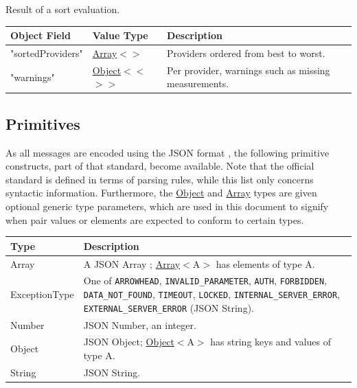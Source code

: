 \documentclass[a4paper]{arrowhead}
\newcommand{\pdef}[1]{{\textcolor{ArrowheadGrey}{#1 \label{sec:model:primitives:#1} \label{sec:model:primitives:#1s}}}}
\newcommand{\pref}[1]{{\textcolor{ArrowheadGrey}{\hyperref[sec:model:primitives:#1]{#1}}}}
\begin{document}

Result of a sort evaluation.


\noindent\begin{tabularx}{\textwidth}{| >{\raggedright\arraybackslash}p{3.9cm} | >{\raggedright\arraybackslash\small}p{5.3cm} | X |} \hline
\rowcolor{gray!33} Object Field & Value Type & Description \\ \hline
"sorted\allowbreak{}Providers" & \pref{Array}$<$\allowbreak{}\pref{String}$>$ & Providers ordered from best to worst. \\ \hline
"warnings" & \pref{Object}$<$\allowbreak{}\pref{Array}$<$\allowbreak{}\pref{String}$>$$>$ & Per provider, warnings such as missing measurements. \\ \hline
\end{tabularx}



\subsection{Primitives}
\label{sec:model:primitives}

As all messages are encoded using the JSON format \cite{rfc8259}, the following primitive constructs, part of that standard, become available.
Note that the official standard is defined in terms of parsing rules, while this list only concerns syntactic information.
Furthermore, the \pref{Object} and \pref{Array} types are given optional generic type parameters, which are used in this document to signify when pair values or elements are expected to conform to certain types.

\noindent\begin{tabularx}{\textwidth}{| p{4.6cm} | X |} \hline
\rowcolor{gray!33} Type & Description \\ \hline
\pdef{Array} & A JSON Array \cite{rfc8259}; \pref{Array}$<$A$>$ has elements of type A. \\ \hline
\pdef{ExceptionType} & One of \texttt{ARROWHEAD}, \texttt{INVALID\_\allowbreak{}PARAMETER}, \texttt{AUTH}, \texttt{FORBIDDEN}, \texttt{DATA\_\allowbreak{}NOT\_\allowbreak{}FOUND}, \texttt{TIMEOUT}, \texttt{LOCKED}, \texttt{INTERNAL\_\allowbreak{}SERVER\_\allowbreak{}ERROR}, \texttt{EXTERNAL\_\allowbreak{}SERVER\_\allowbreak{}ERROR} (JSON String). \\ \hline
\pdef{Number} & JSON Number, an integer. \\ \hline
\pdef{Object} & JSON Object; \pref{Object}$<$A$>$ has string keys and values of type A. \\ \hline
\pdef{String} & JSON String. \\ \hline
\end{tabularx}
\end{document}
